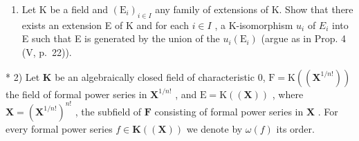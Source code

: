 \BourbakiExerciseGroup

\begin{enumerate}
\def\labelenumi{\arabic{enumi})}
\tightlist
\item
  Let K be a field and \((\mathrm{E}_{i})_{i\in I}\) any family of extensions of K. Show that there exists an extension E of K and for each \(i\in I\) , a K-isomorphism \(u_{i}\) of \(E_{i}\) into E such that E is generated by the union of the \(u_{i}(\mathrm{E}_{i})\) (argue as in Prop. 4 (V, p.~22)).
\end{enumerate}

* 2) Let \(\mathbf{K}\) be an algebraically closed field of characteristic 0, \(\mathrm{F} = \mathrm{K}((\mathbf{X}^{1 / n!}))\) the field of formal power series in \(\mathbf{X}^{1 / n!}\) , and \(\mathrm{E} = \mathrm{K}((\mathbf{X}))\) , where \(\mathbf{X} = (\mathbf{X}^{1 / n!})^{n!}\) , the subfield of \(\mathbf{F}\) consisting of formal power series in \(\mathbf{X}\) . For every formal power series \(f \in \mathbf{K}((\mathbf{X}))\) we denote by \(\omega(f)\) its order.

